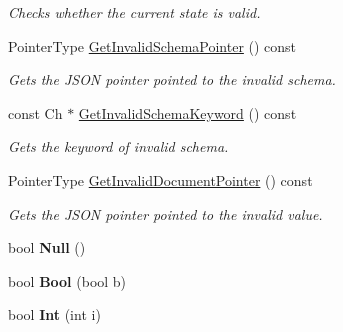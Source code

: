 \begin{DoxyCompactItemize}
\begin{DoxyCompactList}\small\item\em Checks whether the current state is valid. \end{DoxyCompactList}\item 
Pointer\+Type \hyperlink{class_generic_schema_validator_a39879de53c70fd5d3c018b61d1235681}{Get\+Invalid\+Schema\+Pointer} () const \hypertarget{class_generic_schema_validator_a39879de53c70fd5d3c018b61d1235681}{}\label{class_generic_schema_validator_a39879de53c70fd5d3c018b61d1235681}

\begin{DoxyCompactList}\small\item\em Gets the J\+S\+ON pointer pointed to the invalid schema. \end{DoxyCompactList}\item 
const Ch $\ast$ \hyperlink{class_generic_schema_validator_a016b23047ed66bac570e378fbaaf839b}{Get\+Invalid\+Schema\+Keyword} () const \hypertarget{class_generic_schema_validator_a016b23047ed66bac570e378fbaaf839b}{}\label{class_generic_schema_validator_a016b23047ed66bac570e378fbaaf839b}

\begin{DoxyCompactList}\small\item\em Gets the keyword of invalid schema. \end{DoxyCompactList}\item 
Pointer\+Type \hyperlink{class_generic_schema_validator_ae65727ef84d82f3e31e1f57543e71320}{Get\+Invalid\+Document\+Pointer} () const \hypertarget{class_generic_schema_validator_ae65727ef84d82f3e31e1f57543e71320}{}\label{class_generic_schema_validator_ae65727ef84d82f3e31e1f57543e71320}

\begin{DoxyCompactList}\small\item\em Gets the J\+S\+ON pointer pointed to the invalid value. \end{DoxyCompactList}\item 
bool {\bfseries Null} ()\hypertarget{class_generic_schema_validator_a7137af73e934f50c66cbb8a9aa802ea6}{}\label{class_generic_schema_validator_a7137af73e934f50c66cbb8a9aa802ea6}

\item 
bool {\bfseries Bool} (bool b)\hypertarget{class_generic_schema_validator_aa25fa7456f2f308a105e400f01a4afde}{}\label{class_generic_schema_validator_aa25fa7456f2f308a105e400f01a4afde}

\item 
bool {\bfseries Int} (int i)\hypertarget{class_generic_schema_validator_ad823c29990225661a4df69d34647b659}{}\label{class_generic_schema_validator_ad823c29990225661a4df69d34647b659}


\end{DoxyCompactItemize}
